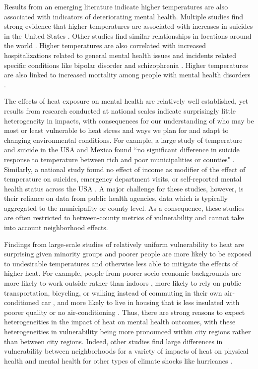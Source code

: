 \documentclass[fleqn,10pt]{wlscirep}
\begin{document}
Results from an emerging literature indicate higher temperatures are also associated with indicators of deteriorating mental health.  Multiple studies find strong evidence that higher temperatures are associated with increases in suicides in the United States \cite{Burke2018Aug, Mullins2019Dec, Dixon2007May}. Other studies find similar relationships in locations around the world \cite{Qi2014Dec, Page2007Aug, Likhvar2011Jan}. Higher temperatures are also correlated with increased hospitalizations related to general mental health issues \cite{Obradovich2018Oct, Mullins2019Dec} and incidents related specific conditions like bipolar disorder and schizophrenia \cite{Lee2007Jan, Sung2013Feb}. Higher temperatures are also linked to increased mortality among people with mental health disorders \cite{Hansen2008Oct}.

The effects of heat exposure on mental health are relatively well established, yet results from research conducted at national scales indicate surprisingly little heterogeneity in impacts, with consequences for our understanding of who may be most or least vulnerable to heat stress and ways we plan for and adapt to changing environmental conditions. For example, a large study of temperature and suicide in the USA and Mexico found ``no significant difference in suicide response to temperature between rich and poor municipalities or counties" \cite{Burke2018Aug}. Similarly, a national study found no effect of income as modifier of the effect of temperature on suicides, emergency department visits, or self-reported mental health status across the USA \cite{Mullins2019Dec}. A major challenge for these studies, however, is their reliance on data from public health agencies, data which is typically aggregated to the municipality or county level.  As a consequence, these studies are often restricted to between-county metrics of vulnerability and cannot take into account neighborhood effects.

Findings from large-scale studies of relatively uniform vulnerability to heat are surprising given minority groups and poorer people are more likely to be exposed to undesirable temperatures and otherwise less able to mitigate the effects of higher heat. For example, people from poorer socio-economic backgrounds are more likely to work outside rather than indoors \cite{Gubernot2014Oct}, more likely to rely on public transportation, bicycling, or walking instead of commuting in their own air-conditioned car \cite{Karner2015Dec}, and more likely to live in housing that is less insulated with poorer quality or no air-conditioning \cite{Samuelson2020Jun}. Thus, there are strong reasons to expect heterogeneities in the impact of heat on mental health outcomes, with these heterogeneities in vulnerability being more pronounced within city regions rather than between city regions. Indeed, other studies find large differences in vulnerability between neighborhoods for a variety of impacts of heat on physical health  \cite{Belanger2015Mar, Uejio2011Mar} and mental health for other types of climate shocks like hurricanes \cite{ferre2019hurricane, Gruebner2015Jun}.
\end{document}
